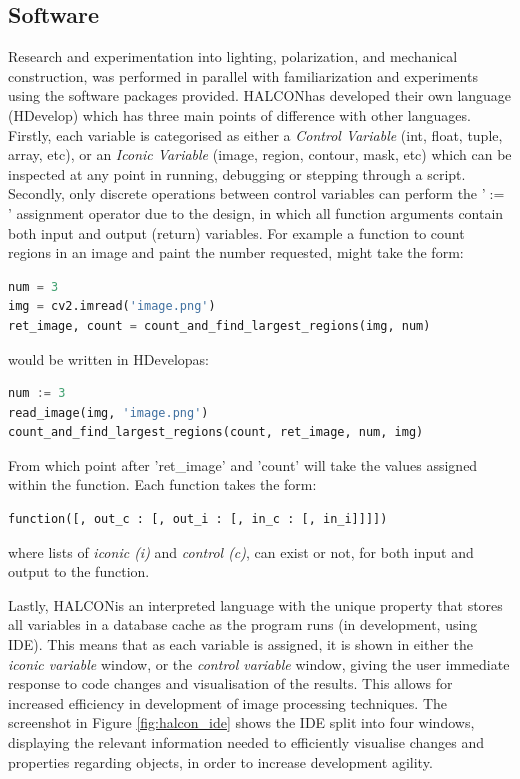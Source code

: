 \documentclass[fleqn,twoside,12pt]{report}
\begin{document}
\subsection{Software}
\label{sec:software}

Research and experimentation into lighting, polarization, and mechanical construction, was performed in parallel with familiarization and experiments using the software packages provided. HALCON\texttrademark has developed their own language (HDevelop\texttrademark) which has three main points of difference with other languages. Firstly, each variable is categorised as either a \textit{Control Variable} (int, float, tuple, array, etc), or an \textit{Iconic Variable} (image, region, contour, mask, etc) which can be inspected at any point in running, debugging or stepping through a script. Secondly, only discrete operations between control variables can perform the '$:=$' assignment operator due to the design, in which all function arguments contain both input and output (return) variables. For example a function to count regions in an image and paint the number requested, might take the form:

\begin{lstlisting}[language=Python]
num = 3
img = cv2.imread('image.png')
ret_image, count = count_and_find_largest_regions(img, num)
\end{lstlisting}

would be written in HDevelop\texttrademark as:

\begin{lstlisting}[language=Python]
num := 3
read_image(img, 'image.png')
count_and_find_largest_regions(count, ret_image, num, img)
\end{lstlisting} 

From which point after 'ret\_image' and 'count' will take the values assigned within the function. Each function takes the form:

\begin{lstlisting}[language=Python]
function([, out_c : [, out_i : [, in_c : [, in_i]]]])
\end{lstlisting} 

where lists of  \textit{iconic (i)} and  \textit{control (c)}, can exist or not, for both input and output to the function.


Lastly, HALCON\texttrademark is an interpreted language with the unique property that stores all variables in a database cache as the program runs (in development, using IDE). This means that as each variable is assigned, it is shown in either the \textit{iconic variable} window, or the \textit{control variable} window, giving the user immediate response to code changes and visualisation of the results. This allows for increased efficiency in development of image processing techniques. The screenshot in Figure \ref{fig:halcon_ide} shows the IDE split into four windows, displaying the relevant information needed to efficiently visualise changes and properties regarding objects, in order to increase development agility.  
\end{document}
